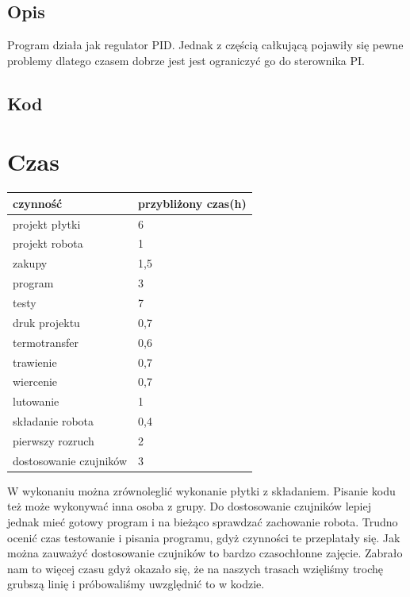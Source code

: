\documentclass[a4paper,11pt]{article}
\begin{document}
\subsection{Opis}
Program działa jak regulator PID. Jednak z częścią całkującą pojawiły się pewne problemy dlatego czasem dobrze jest jest ograniczyć go do sterownika PI.

\subsection{Kod}

\section{Czas}
\begin{center}


	\begin{tabular}{|l|l|}
		\hline
		czynność				& przybliżony czas(h)		\\ \hline
		projekt płytki			& 6							\\
		projekt robota			& 1							\\
		zakupy					& 1,5						\\
		program					& 3							\\
		testy					& 7							\\
		druk projektu			& 0,7						\\
		termotransfer			& 0,6						\\
		trawienie				& 0,7						\\
		wiercenie				& 0,7						\\
		lutowanie				& 1							\\
		składanie robota			& 0,4						\\
		pierwszy rozruch			& 2							\\
		dostosowanie czujników	& 3							\\

		\hline
	\end{tabular}
\end{center}
W wykonaniu można zrównoleglić  wykonanie płytki z składaniem. Pisanie kodu też może wykonywać inna osoba z grupy. Do dostosowanie czujników lepiej jednak mieć gotowy program i na bieżąco sprawdzać zachowanie robota.
Trudno ocenić czas testowanie i pisania programu, gdyż czynności te przeplatały się.
Jak można zauważyć dostosowanie czujników to bardzo czasochłonne zajęcie. Zabrało nam to więcej czasu gdyż okazało się, że na naszych trasach wzięliśmy trochę grubszą linię i próbowaliśmy uwzględnić to w kodzie.
\end{document}
